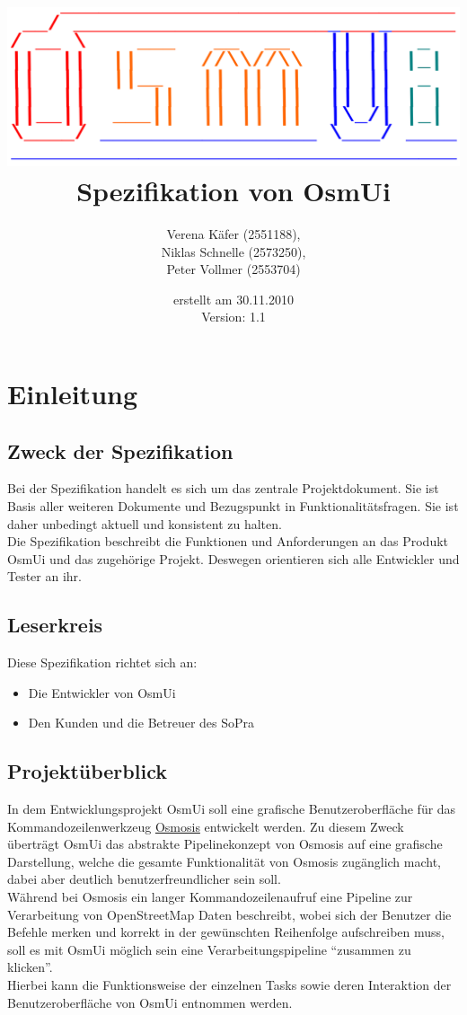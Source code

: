 \documentclass[a4paper,12pt]{scrartcl}
\author{
Verena Käfer (2551188),\\
Niklas Schnelle (2573250),\\
Peter Vollmer (2553704)}
\date{erstellt am 30.11.2010\\
Version: 1.1}
\title{\includegraphics[width=15cm]{../projektplan/Logo_Osmui.png} \\ 
Spezifikation von OsmUi}
\begin{document}
\maketitle
\newpage
\tableofcontents
\newpage

\section{Einleitung}
\subsection{Zweck der Spezifikation}
Bei der Spezifikation handelt es sich um das zentrale Projektdokument. Sie ist Basis aller weiteren Dokumente und
Bezugspunkt in Funktionalitätsfragen. Sie ist daher unbedingt aktuell und konsistent zu halten.\\
Die Spezifikation beschreibt die Funktionen und Anforderungen an das Produkt OsmUi und das zugehörige Projekt. Deswegen orientieren sich alle Entwickler und Tester an ihr.
\subsection{Leserkreis}
Diese Spezifikation richtet sich an:
\begin{itemize}
 \item Die Entwickler von OsmUi
 \item Den Kunden und die Betreuer des SoPra
\end{itemize}

\subsection{Projektüberblick}
In dem Entwicklungsprojekt OsmUi soll eine grafische Benutzeroberfläche für das Kommandozeilenwerkzeug \href{http://wiki.openstreetmap.org/wiki/Osmosis}{Osmosis}
entwickelt werden. Zu diesem Zweck überträgt OsmUi das abstrakte Pipelinekonzept von Osmosis auf eine grafische Darstellung, welche die gesamte Funktionalität von Osmosis zugänglich macht, dabei aber deutlich benutzerfreundlicher sein soll.\\
Während bei Osmosis ein langer Kommandozeilenaufruf eine Pipeline zur Verarbeitung von OpenStreetMap Daten beschreibt, wobei sich der Benutzer die Befehle merken
und korrekt in der gewünschten Reihenfolge aufschreiben muss, soll es mit OsmUi möglich sein eine Verarbeitungspipeline ``zusammen zu klicken''.\\
Hierbei kann die Funktionsweise der einzelnen Tasks sowie deren Interaktion der Benutzeroberfläche von OsmUi entnommen werden.
\end{document}
